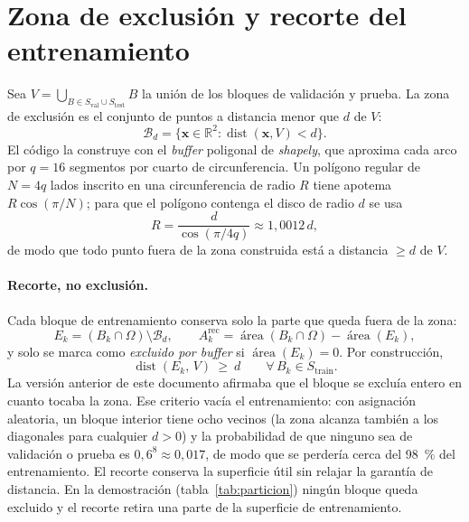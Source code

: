 \documentclass[11pt,a4paper]{article}
\newcommand{\vect}[1]{\mathbf{#1}}
\newcommand{\trainset}{S_{\mathrm{train}}}
\newcommand{\valset}{S_{\mathrm{val}}}
\newcommand{\testset}{S_{\mathrm{test}}}
\begin{document}
\section{Zona de exclusión y recorte del entrenamiento}\label{sec:buffer}

Sea $V = \bigcup_{B\in\valset\cup\testset} B$ la unión de los bloques de validación y prueba. La zona de
exclusión es el conjunto de puntos a distancia menor que $d$ de $V$:
\begin{equation}
  \mathcal B_d = \{\vect x\in\mathbb R^2 : \operatorname{dist}(\vect x, V) < d\}.
\end{equation}
El código la construye con el \emph{buffer} poligonal de \emph{shapely}, que aproxima cada arco por
$q = 16$ segmentos por cuarto de circunferencia. Un polígono regular de $N = 4q$ lados inscrito en una
circunferencia de radio $R$ tiene apotema $R\cos(\pi/N)$; para que el polígono contenga el disco de
radio $d$ se usa
\begin{equation}
  R = \frac{d}{\cos\!\left(\pi/4q\right)} \approx 1{,}0012\,d,
\end{equation}
de modo que todo punto fuera de la zona construida está a distancia $\ge d$ de $V$.

\paragraph{Recorte, no exclusión.} Cada bloque de entrenamiento conserva solo la parte que queda fuera
de la zona:
\begin{equation}
  E_{k} = (B_k\cap\Omega)\setminus\mathcal B_d,\qquad
  A^{\mathrm{rec}}_{k} = \operatorname{área}(B_k\cap\Omega) - \operatorname{área}(E_k),
\end{equation}
y solo se marca como \emph{excluido por buffer} si $\operatorname{área}(E_k) = 0$. Por construcción,
\begin{equation}
  \operatorname{dist}(E_k,\, V)\ \ge\ d\qquad\forall\, B_k\in\trainset .
\end{equation}
La versión anterior de este documento afirmaba que el bloque se excluía entero en cuanto tocaba la zona.
Ese criterio vacía el entrenamiento: con asignación aleatoria, un bloque interior tiene ocho vecinos (la
zona alcanza también a los diagonales para cualquier $d>0$) y la probabilidad de que ninguno sea de
validación o prueba es $0{,}6^{8}\approx 0{,}017$, de modo que se perdería cerca del 98~\% del
entrenamiento. El recorte conserva la superficie útil sin relajar la garantía de distancia. En la
demostración (tabla~\ref{tab:particion}) ningún bloque queda excluido y el recorte retira una parte de
la superficie de entrenamiento.
\end{document}
